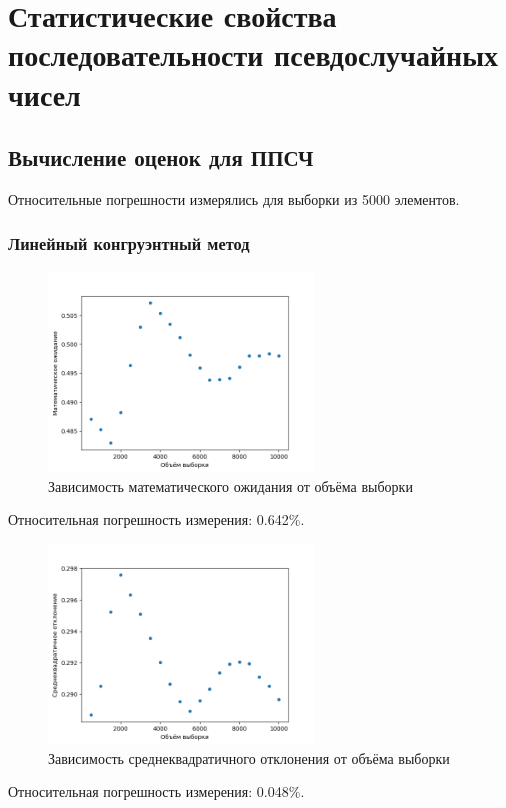 \documentclass[bachelor, och, labwork]{SCWorks}
\begin{document}
\section{Статистические свойства последовательности псевдослучайных чисел}
\subsection{Вычисление оценок для ППСЧ}
Относительные погрешности измерялись для выборки из 5000 элементов.
\subsubsection{Линейный конгруэнтный метод}
\begin{figure}[H]
    \centering
    \includegraphics[width=0.63\textwidth]{lc_me.png}
    \caption{Зависимость математического ожидания от объёма выборки}
\end{figure}
Относительная погрешность измерения: 0.642\%.

\begin{figure}[H]
    \centering
    \includegraphics[width=0.63\textwidth]{lc_st.png}
    \caption{Зависимость среднеквадратичного отклонения от объёма выборки}
\end{figure}
Относительная погрешность измерения: 0.048\%.
\end{document}

